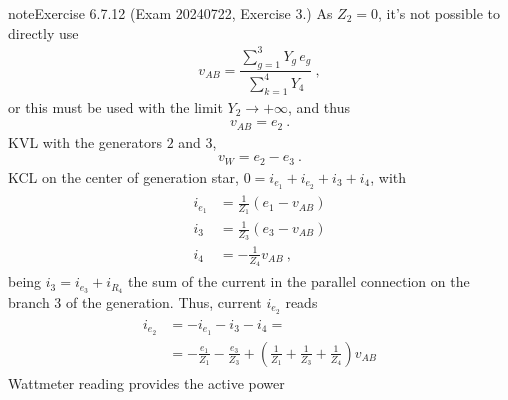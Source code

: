 \documentclass[letterpaper,10pt,english]{jupyterBook}
\begin{document}
\begin{sphinxadmonition}{note}{Exercise 6.7.12 (Exam 2024\sphinxhyphen{}07\sphinxhyphen{}22, Exercise 3.)}
\sphinxAtStartPar
{} As \(Z_2 = 0\), it’s not possible to directly use
\begin{equation*}
\begin{split}v_{AB} = \dfrac{ \sum_{g=1}^{3} Y_g \, e_g }{\sum_{k=1}^{4} Y_4} \ ,\end{split}
\end{equation*}
\sphinxAtStartPar
or this must be used with the limit \(Y_2 \rightarrow + \infty\), and thus
\begin{equation*}
\begin{split}v_{AB} = e_2 \ .\end{split}
\end{equation*}
\sphinxAtStartPar
{} KVL with the generators \(2\) and \(3\),
\begin{equation*}
\begin{split}v_W = e_2 - e_3 \ .\end{split}
\end{equation*}
\sphinxAtStartPar
{} KCL on the center of generation star, \(0 = i_{e_1} + i_{e_2} + i_{3} + i_{4}\), with
\begin{equation*}
\begin{split}\begin{aligned}
  i_{e_1} & =  \frac{1}{Z_1} ( e_1 - v_{AB} ) \\
  i_{3}   & =  \frac{1}{Z_3} ( e_3 - v_{AB} ) \\
  i_{4}   & = -\frac{1}{Z_4}   v_{AB}   \ ,
\end{aligned}\end{split}
\end{equation*}
\sphinxAtStartPar
being \(i_3 = i_{e_3} + i_{R_4}\) the sum of the current in the parallel connection on the branch \(3\) of the generation. Thus, current \(i_{e_2}\) reads
\begin{equation*}
\begin{split}\begin{aligned}
  i_{e_2} 
  & = - i_{e_1} - i_{3} - i_{4} = \\
  & = - \frac{e_1}{Z_1} - \frac{e_3}{Z_3} + \left(  \frac{1}{Z_1} + \frac{1}{Z_3} + \frac{1}{Z_4}  \right) v_{AB}
\end{aligned}\end{split}
\end{equation*}
\sphinxAtStartPar
{} Wattmeter reading provides the active power
\begin{equation*}

\end{equation*}
\end{sphinxadmonition}
\end{document}
